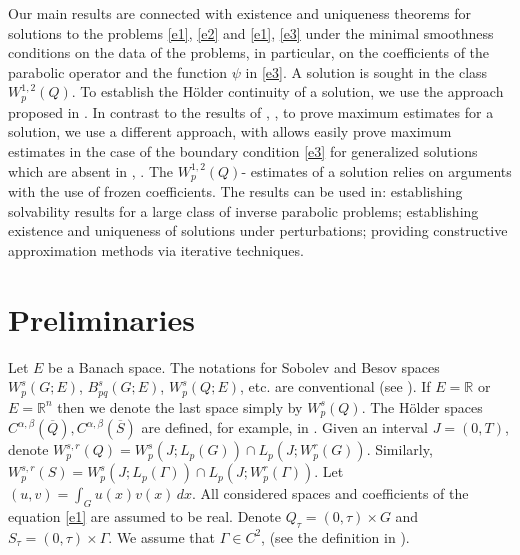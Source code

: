 \documentclass{article}
\theoremstyle{plain}
\begin{document}
Our main results are connected with existence and uniqueness theorems  for solutions to the problems  \eqref{e1}, \eqref{e2} and  \eqref{e1}, \eqref{e3}
under the minimal smoothness conditions on the data of the problems, in particular, on the coefficients of  the parabolic operator and the function $\psi$ in \eqref{e3}.
A solution is sought in the class $W_p^{1,2}(Q)$. To establish the H\"{o}lder continuity of a solution,  we use the approach proposed in \cite{lad}.
In contrast to the results of \cite{lad}, \cite{lie}, to prove   maximum estimates for a solution, we use a different  approach, with allows 
easily prove  maximum estimates in the case of the boundary condition \eqref{e3} for generalized solutions which are absent in  \cite{lad}, \cite{lie}.
The $W_p^{1,2}(Q)$- estimates of a solution relies on arguments with the use of frozen coefficients. The results can be used in: establishing solvability results  for a large class of inverse parabolic problems; establishing existence and uniqueness of solutions under perturbations;  providing constructive approximation methods via iterative techniques.





\section{Preliminaries}

Let $E$ be a Banach space.
The notations for Sobolev and Besov spaces $W_p^s(G;E)$,  $B_{pq}^s(G;E)$, $W_p^s(Q;E)$, etc.
    are conventional (see \cite{tri,ama}). If $E={\mathbb R}$ or
    $E={\mathbb R}^n$ then we denote the last space simply
    by  $W_{p}^{s}(Q)$. The  H\"{o}lder spaces
    $C^{\alpha,\beta}(\overline{Q}),
    C^{\alpha,\beta}(\overline{S})$ are defined, for example,  in
    \cite{lad}.
 Given an interval $J=(0,T)$, denote
    $W_p^{s,r}(Q)=W_p^{s}(J;L_p(G))\cap L_p(J;W_p^r(G)) $.
    Similarly,   $W_p^{s,r}(S)=W_p^{s}(J;L_p(\Gamma))\cap
    L_p(J;W_p^r(\Gamma))$.
Let     $(u,v)=\int_{G} u(x)v(x)\, dx$. All considered spaces and coefficients of the equation \eqref{e1} are assumed to be
      real.            Denote    $Q_{\tau}=(0,\tau)\times G$ and  $S_\tau=(0,\tau)\times \Gamma$.
We assume that  $\Gamma\in C^2$,   (see the definition  in \cite[Chapter 1]{ lad}).
              
\end{document}
